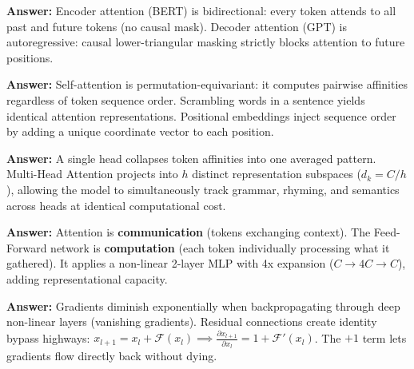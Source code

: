 \documentclass[10pt,a4paper]{article}
\begin{document}
\begin{tcolorbox}[title=Q6: Difference between Encoder Attention and Decoder Attention?]
\textbf{Answer:} Encoder attention (BERT) is bidirectional: every token attends to all past and future tokens (no causal mask). Decoder attention (GPT) is autoregressive: causal lower-triangular masking strictly blocks attention to future positions.
\end{tcolorbox}

\begin{tcolorbox}[title=Q7: Why do Transformers strictly require Positional Embeddings?]
\textbf{Answer:} Self-attention is permutation-equivariant: it computes pairwise affinities regardless of token sequence order. Scrambling words in a sentence yields identical attention representations. Positional embeddings inject sequence order by adding a unique coordinate vector to each position.
\end{tcolorbox}

\begin{tcolorbox}[title=Q8: Why use Multi-Head Attention instead of one large Single Attention Head?]
\textbf{Answer:} A single head collapses token affinities into one averaged pattern. Multi-Head Attention projects into $h$ distinct representation subspaces ($d_k = C/h$), allowing the model to simultaneously track grammar, rhyming, and semantics across heads at identical computational cost.
\end{tcolorbox}

\begin{tcolorbox}[title=Q9: What is the exact function of the Feed-Forward Network?]
\textbf{Answer:} Attention is \textbf{communication} (tokens exchanging context). The Feed-Forward network is \textbf{computation} (each token individually processing what it gathered). It applies a non-linear 2-layer MLP with 4x expansion ($C \to 4C \to C$), adding representational capacity.
\end{tcolorbox}

\begin{tcolorbox}[title=Q10: Why are Residual Connections critical for training deep Transformers?]
\textbf{Answer:} Gradients diminish exponentially when backpropagating through deep non-linear layers (vanishing gradients). Residual connections create identity bypass highways: $x_{l+1} = x_l + \mathcal{F}(x_l) \implies \frac{\partial x_{l+1}}{\partial x_l} = 1 + \mathcal{F}'(x_l)$. The $+1$ term lets gradients flow directly back without dying.
\end{tcolorbox}
\end{document}
